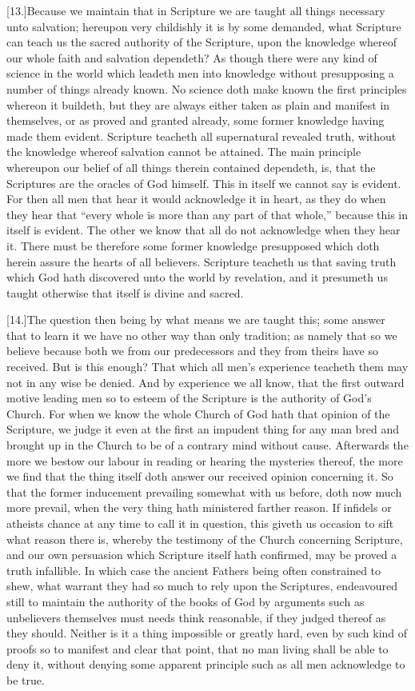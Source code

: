 [13.]Because we maintain that in Scripture we are taught all things necessary unto salvation; hereupon very childishly it is by some demanded, what Scripture can teach us the sacred authority of the Scripture, upon the knowledge whereof our whole faith and salvation dependeth? As though there were any kind of science in the world which leadeth men into knowledge without presupposing a number of things already known. No science doth make known the first principles whereon it buildeth, but they are always either taken as plain and manifest in themselves, or as proved and granted already, some former knowledge having made them evident. Scripture teacheth all supernatural revealed truth, without the knowledge whereof salvation cannot be attained. The main principle whereupon our belief of all things therein contained dependeth, is, that the Scriptures are the oracles of God himself. This in itself we cannot say is evident. For then all men that hear it would acknowledge it in heart, as they do when they hear that “every whole is more than any part of that whole,” because this in itself is evident. The  other we know that all do not acknowledge when they hear it. There must be therefore some former knowledge presupposed which doth herein assure the hearts of all believers. Scripture teacheth us that saving truth which God hath discovered unto the world by revelation, and it presumeth us taught otherwise that itself is divine and sacred.

[14.]The question then being by what means we are taught this; some answer that to learn it we have no other way than only tradition; as namely that so we believe because both we from our predecessors and they from theirs have so received. But is this enough? That which all men’s experience teacheth them may not in any wise be denied. And by experience we all know, that the first outward motive leading men so to esteem of the Scripture is the authority of God’s Church. For when we know the whole Church of God hath that opinion of the Scripture, we judge it even at the first an impudent thing for any man bred and brought up in the Church to be of a contrary mind without cause. Afterwards the more we bestow our labour in reading or hearing the mysteries thereof, the more we find that the thing itself doth answer our received opinion concerning it. So that the former inducement prevailing somewhat with us before, doth now much more prevail, when the very thing hath ministered farther reason. If infidels or atheists  chance at any time to call it in question, this giveth us occasion to sift what reason there is, whereby the testimony of the Church concerning Scripture, and our own persuasion which Scripture itself hath confirmed, may be proved a truth infallible. In which case the ancient Fathers being often constrained to shew, what warrant they had so much to rely upon the Scriptures, endeavoured still to maintain the authority of the books of God by arguments such as unbelievers themselves must needs think reasonable, if they judged thereof as they should. Neither is it a thing impossible or greatly hard, even by such kind of proofs so to manifest and clear that point, that no man living shall be able to deny it, without denying some apparent principle such as all men acknowledge to be true.

